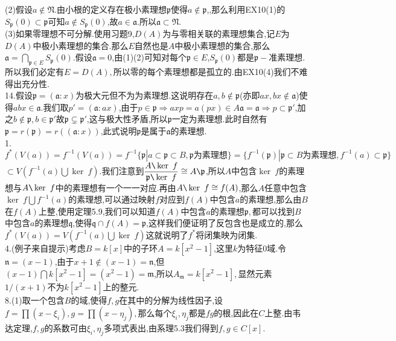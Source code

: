 \documentclass[b5paper]{ctexart}
\begin{document}
(2)假设$a\notin \mathfrak{N}$.由小根的定义存在极小素理想$\mathfrak{p}$使得$a\notin\mathfrak{p}$,,那么利用EX10(1)的$S_{\mathfrak{p}}(0)\subset\mathfrak{p}$可知$a\notin S_\mathfrak{p}(0)$,故$a\in \mathfrak{a}.$所以$\mathfrak{a}\subset \mathfrak{N}$.\\
(3)如果零理想不可分解.使用习题9,$D(A)$为与零相关联的素理想集合,记$E$为$D(A)$中极小素理想的集合.那么$E$自然也是$A$中极小素理想的集合,那么$\mathfrak{a}=\bigcap\limits_{\mathfrak{p}\in E}S_{\mathfrak{p}}(0).$假设$\mathfrak{a}=0$,由(1)(2)可知对每个$\mathfrak{p}\in E$,$S_{\mathfrak{p}}(0)$都是$\mathfrak{p}-$准素理想.所以我们必定有$E=D(A),$所以零的每个素理想都是孤立的.由EX10(4)我们不难得出充分性.\\
14.假设$\mathfrak{p}=(\mathfrak{a}:x)$为极大元但不为为素理想.这说明存在$a,b\notin \mathfrak{p}$(亦即$ax,bx\notin \mathfrak{a}$)使得$abx\in \mathfrak{a}$.我们取$p'=(\mathfrak{a}:ax)$,由于$p\in\mathfrak{p}\Rightarrow axp=a(px)\in A\mathfrak{a}=\mathfrak{a}\Rightarrow p\subset\mathfrak{p}'$,加之$b\notin \mathfrak{p},b\in\mathfrak{p}'$故$\mathfrak{p}\subsetneq \mathfrak{p}'$,这与极大性矛盾,所以$\mathfrak{p}$一定为素理想.此时自然有$\mathfrak{p}=r(\mathfrak{p})=r((\mathfrak{a}:x))$,此式说明$\mathfrak{p}$是属于$\mathfrak{a}$的素理想.\\
1.$f^*(V(a))=f^{-1}(V(a))=f^{-1}\{\mathfrak{p}|a\subset
\mathfrak{p}\subset B ,\mathfrak{p}\text{为素理想}\}=\{f^{-1}(\mathfrak{p})|\mathfrak{p}\subset B\text{为素理想},f^{-1}(a)\subset\mathfrak{p}\}$\\
$\subset V(f^{-1}(a)\bigcup \ker~f)$.我们注意到$\dfrac{A\texttt{\char92}\ker~f}{\mathfrak{p}\texttt{\char92}\ker~f}\cong A\texttt{\char92}\mathfrak{p}$,所以$A$中包含$\ker~f$的素理想与$A\texttt{\char92}\ker~f$中的素理想有一个一一对应.再由$A\texttt{\char92}\ker~f\cong f(A)$,那么$A$任意中包含$\ker~f\bigcup f^{-1}(a)$的素理想,可以通过映射$f$对应到$f(A)$中包含$a$的素理想,那么由$B$在$f(A)$上整,使用定理5.9,我们可以知道$f(A)$中包含$a$的素理想$\mathfrak{p},$都可以找到$B$中包含$a$的素理想$\mathfrak{q}$,使得$\mathfrak{q}\cap f(A)=\mathfrak{p}$,这样我们便证明了反包含也是成立的,那么$f^*(V(a))=V(f^{-1}(a)\bigcup \ker~f)$这就说明了$f^*$将闭集映为闭集.\\
4.(例子来自提示)考虑$B=k[x]$中的子环$A=k[x^2-1]$,这里$k$为特征0域.令$\mathfrak{n}=(x-1)$,由于$x+1\notin (x-1)=\mathfrak{n}$,但$(x-1)\bigcap k[x^2-1]=(x^2-1)=\mathfrak{m}$,所以$A_{\mathfrak{m}}=k[x^2-1],$显然元素$1/(x+1)$不为$k[x^2-1]$上的整元.\\
8.(1)取一个包含$B$的域,使得$f,g$在其中的分解为线性因子,设$f=\prod(x-\xi_i),g=\prod(x-\eta_j),$那么每个$\xi_i,\eta_j$都是$fg$的根,因此在$C$上整.由韦达定理,$f,g$的系数可由$\xi_i,\eta_j$多项式表出,由系理5.3我们得到$f,g\in C[x].$\\
\end{document}
